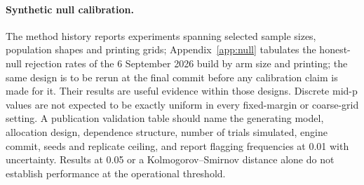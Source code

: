 \documentclass[11pt,a4paper]{article}
\begin{document}
\paragraph{Synthetic null calibration.} The method history reports experiments spanning selected sample sizes, population shapes and printing grids; Appendix~\ref{app:null} tabulates the honest-null rejection rates of the 6 September 2026 build by arm size and printing; the same design is to be rerun at the final commit before any calibration claim is made for it. Their results are useful evidence within those designs. Discrete mid-p values are not expected to be exactly uniform in every fixed-margin or coarse-grid setting. A publication validation table should name the generating model, allocation design, dependence structure, number of trials simulated, engine commit, seeds and replicate ceiling, and report flagging frequencies at 0.01 with uncertainty. Results at 0.05 or a Kolmogorov--Smirnov distance alone do not establish performance at the operational threshold.
\end{document}

